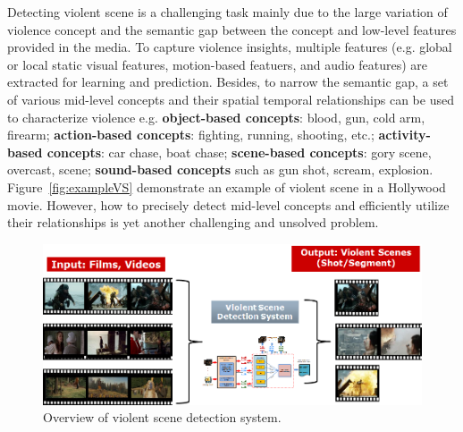 \documentclass[review]{elsarticle}
\begin{document}
Detecting violent scene is a challenging task mainly due to the large variation of violence concept and the semantic gap between the concept and low-level features provided in the media. To capture violence insights, multiple features (e.g. global or local static visual features, motion-based featuers, and audio features) are extracted for learning and prediction. Besides, to narrow the semantic gap, a set of various mid-level concepts and their spatial temporal relationships can be used to characterize violence e.g. {\bf object-based concepts}: blood,  gun, cold arm, firearm; {\bf action-based concepts}: fighting, running, shooting, etc.; {\bf activity-based concepts}: car chase, boat chase; {\bf scene-based concepts}: gory scene, overcast, scene; {\bf sound-based concepts} such as gun shot, scream, explosion. Figure~\ref{fig:exampleVS} demonstrate an example of violent scene in a Hollywood movie. However, how to precisely detect mid-level concepts and efficiently utilize their relationships is yet another challenging and unsolved problem.
\begin{figure}[!b]
	\centering
	\includegraphics[width=1\linewidth]{Images/SystemOverview.png}
	\caption{Overview of violent scene detection system.}
	\label{fig:systemoverview}
\end{figure}

\end{document}

